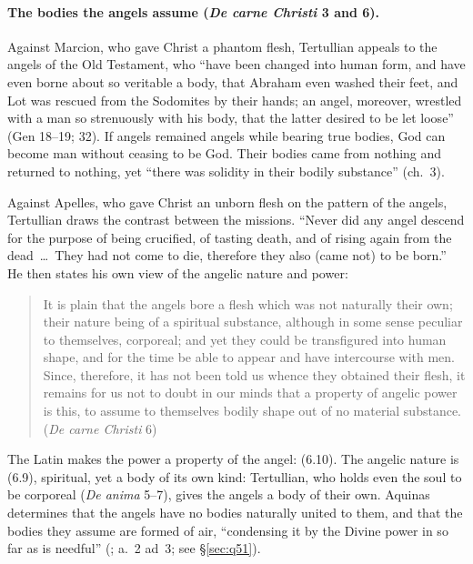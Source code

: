 \paragraph{The bodies the angels assume (\emph{De carne Christi} 3 and 6).}
Against Marcion, who gave Christ a phantom flesh, Tertullian appeals to the
angels of the Old Testament, who ``have been changed into human form, and
have even borne about so veritable a body, that Abraham even washed their
feet, and Lot was rescued from the Sodomites by their hands; an angel,
moreover, wrestled with a man so strenuously with his body, that the
latter desired to be let loose'' (Gen 18--19; 32). If angels remained
angels while bearing true bodies, God can become man without ceasing to be
God. Their bodies came from nothing and returned to nothing, yet ``there
was solidity in their bodily substance'' (ch.~3).

Against Apelles, who gave Christ an unborn flesh on the pattern of the
angels, Tertullian draws the contrast between the missions. ``Never did
any angel descend for the purpose of being crucified, of tasting death,
and of rising again from the dead~\dots\ They had not come to die,
therefore they also (came not) to be born.'' He then states his own view
of the angelic nature and power:
\begin{quote}
It is plain that the angels bore a flesh which was not naturally their
own; their nature being of a spiritual substance, although in some sense
peculiar to themselves, corporeal; and yet they could be transfigured
into human shape, and for the time be able to appear and have intercourse
with men. Since, therefore, it has not been told us whence they obtained
their flesh, it remains for us not to doubt in our minds that a property
of angelic power is this, to assume to themselves bodily shape out of no
material substance. (\emph{De carne Christi} 6)
\end{quote}
\noindent The Latin makes the power a property of the angel:
 (6.10). The angelic nature is  (6.9), spiritual, yet a body of its
own kind: Tertullian, who holds even the soul to be corporeal (\emph{De
anima} 5--7), gives the angels a body of their own. Aquinas determines
that the angels have no bodies naturally united to them, and that the
bodies they assume are formed of air, ``condensing it by the Divine power
in so far as is needful'' (; a.~2 ad~3; see
\S\ref{sec:q51}).


